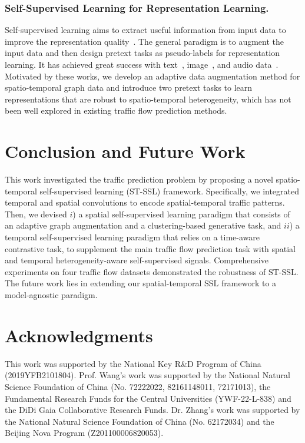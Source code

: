 \documentclass[letterpaper]{article} \usepackage{aaai23}  \usepackage{times}  \usepackage{helvet}  \usepackage{courier}  \usepackage[hyphens]{url}  \usepackage{graphicx} \urlstyle{rm} \def\UrlFont{\rm}  \usepackage{natbib}  \usepackage{caption} \frenchspacing  \setlength{\pdfpagewidth}{8.5in} \setlength{\pdfpageheight}{11in}
\newcommand{\name}{ST-SSL\xspace}
\begin{document}
\subsubsection{Self-Supervised Learning for Representation Learning.} Self-supervised learning aims to extract useful information from input data to improve the representation quality~\cite{hendrycks2019using}. The general paradigm is to augment the input data and then design pretext tasks as pseudo-labels for representation learning. It has achieved great success with text~\cite{kenton2019bert}, image~\cite{chen2020simple}, and audio data~\cite{oord2018representation}. Motivated by these works, we develop an adaptive data augmentation method for spatio-temporal graph data and introduce two pretext tasks to learn representations that are robust to spatio-temporal heterogeneity, which has not been well explored in existing traffic flow prediction methods.


\section{Conclusion and Future Work}

This work investigated the traffic prediction problem by proposing a novel spatio-temporal self-supervised learning (\name) framework. Specifically, we integrated temporal and spatial convolutions to encode spatial-temporal traffic patterns. Then, we devised $i$) a spatial self-supervised learning paradigm that consists of an adaptive graph augmentation and a clustering-based generative task, and $ii$) a temporal self-supervised learning paradigm that relies on a time-aware contrastive task, to supplement the main traffic flow prediction task with spatial and temporal heterogeneity-aware self-supervised signals. Comprehensive experiments on four traffic flow datasets demonstrated the robustness of \name. The future work lies in extending our spatial-temporal SSL framework to a model-agnostic paradigm.





\clearpage

\section*{Acknowledgments}

This work was supported by the National Key R\&D Program of China (2019YFB2101804). Prof. Wang’s work was supported by the National Natural Science Foundation of China (No. 72222022, 82161148011, 72171013), the Fundamental Research Funds for the Central Universities (YWF-22-L-838) and the DiDi Gaia Collaborative Research Funds. Dr. Zhang’s work was supported by the National Natural Science Foundation of China (No. 62172034) and the Beijing Nova Program (Z201100006820053).


\end{document}
